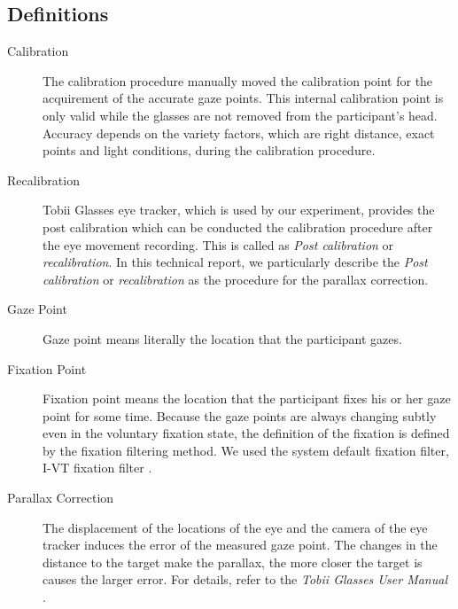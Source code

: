 \documentclass{article}
\begin{document}
\subsection{Definitions}
\label{definitions}
\begin{description}

\item[Calibration]
The calibration procedure manually moved the calibration point for the acquirement of the accurate gaze points. This internal calibration point is only valid while the glasses are not removed from the participant's head. Accuracy depends on the variety factors, which are right distance, exact points and light conditions, during the calibration procedure.

\item[Recalibration]
Tobii Glasses eye tracker, which is used by our experiment, provides the post calibration which can be conducted the calibration procedure after the eye movement recording. This is called as \textit{Post calibration} or \textit{recalibration}. In this technical report, we particularly describe the \textit{Post calibration} or \textit{recalibration} as the procedure for the parallax correction.

\item[Gaze Point]
Gaze point means literally the location that the participant gazes.

\item[Fixation Point]
Fixation point means the location that the participant fixes his or her gaze point for some time. Because the gaze points are always changing subtly even in the voluntary fixation state, the definition of the fixation is defined by the fixation filtering method. We used the system default fixation filter, I-VT fixation filter \citep{Salvucci2000}.

\item[Parallax Correction]
The displacement of the locations of the eye and the camera of the eye tracker induces the error of the measured gaze point. The changes in the distance to the target make the parallax, the more closer the target is causes the larger error. For details, refer to the \textit{Tobii Glasses User Manual} \citep{tobii_manual}.

\end{description} 
 
\end{document}
